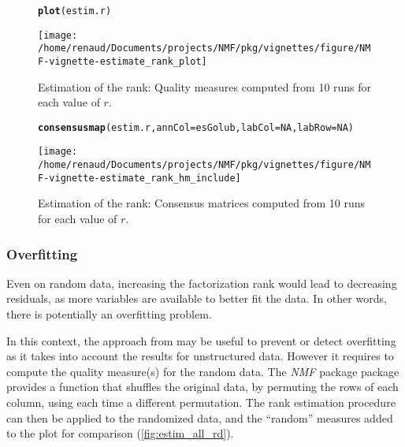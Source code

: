 \documentclass[a4paper]{article}\usepackage{graphicx, color}
\makeatletter
\def\maxwidth{ %
  \ifdim\Gin@nat@width>\linewidth
    \linewidth
  \else
    \Gin@nat@width
  \fi
}
\newcommand{\hlfunctioncall}[1]{\textcolor[rgb]{0.501960784313725,0,0.329411764705882}{\textbf{#1}}}%
\newenvironment{kframe}{%
 \def\at@end@of@kframe{}%
 \ifinner\ifhmode%
  \def\at@end@of@kframe{\end{minipage}}%
  \begin{minipage}{\columnwidth}%
 \fi\fi%
 \def\FrameCommand##1{\hskip\@totalleftmargin \hskip-\fboxsep
 \colorbox{shadecolor}{##1}\hskip-\fboxsep
     \hskip-\linewidth \hskip-\@totalleftmargin \hskip\columnwidth}%
 \MakeFramed {\advance\hsize-\width
   \@totalleftmargin\z@ \linewidth\hsize
   \@setminipage}}%
 {\par\unskip\endMakeFramed%
 \at@end@of@kframe}
\newenvironment{knitrout}{}{} %
\newcommand{\pkgname}[1]{\textit{#1}\xspace}
\newcommand{\Rpkg}[1]{\pkgname{#1} package\xspace}
\newcommand{\nmfpack}{\Rpkg{NMF}}
\renewcommand{\cite}[1]{\parencite{#1}}
\makeatother
\begin{document}
\begin{figure}
\begin{knitrout}
\color{fgcolor}\begin{kframe}
\begin{alltt}
\hlfunctioncall{plot}(estim.r)
\end{alltt}
\end{kframe}
\texttt{[image: /home/renaud/Documents/projects/NMF/pkg/vignettes/figure/NMF-vignette-estimate\_rank\_plot]} 

\end{knitrout}

\caption{Estimation of the rank: Quality measures computed from 10 runs for each value of $r$. \label{fig:estim_all}}
\end{figure}

\begin{figure}
\begin{knitrout}
\color{fgcolor}\begin{kframe}
\begin{alltt}
\hlfunctioncall{consensusmap}(estim.r, annCol = esGolub, labCol = NA, labRow = NA)
\end{alltt}
\end{kframe}
\texttt{[image: /home/renaud/Documents/projects/NMF/pkg/vignettes/figure/NMF-vignette-estimate\_rank\_hm\_include]} 

\end{knitrout}

\caption{Estimation of the rank: Consensus matrices computed from 10 runs for each value of $r$. \label{fig:estim_all_hm}}
\end{figure}

\subsubsection{Overfitting}
Even on random data, increasing the factorization rank would lead to decreasing residuals, as more variables are available to better fit the data.
In other words, there is potentially an overfitting problem. 
 
In this context, the approach from \cite{Frigyesi2008} may be useful to prevent or detect overfitting as it takes into account the results for unstructured data.
However it requires to compute the quality measure(s) for the random data.
The \nmfpack package provides a function that shuffles the original data, by permuting the rows of each column, using each time a different permutation.
The rank estimation procedure can then be applied to the randomized data, and the ``random'' measures added to the plot for comparison (\cref{fig:estim_all_rd}).
\end{document}
